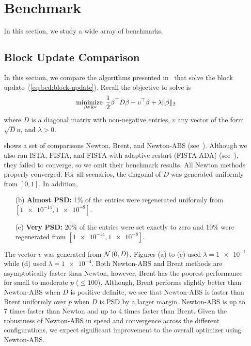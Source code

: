 \section{Benchmark}\label{sec:benchmark}

In this section, we study a wide array of benchmarks.

\subsection{Block Update Comparison}\label{ssec:benchmark:pgd-newton}

In this section, we compare the algorithms presented 
in~
that solve the block update~(\ref{eq:bcd:block-update}).
Recall the objective to solve is
\begin{align*}
    \operatorname*{minimize\;}_{\beta \in \mathbb{R}^p}
    \frac{1}{2} \beta^\top D \beta
    - v^\top \beta
    + \lambda \|\beta\|_2
\end{align*}
where $D$ is a diagonal matrix with non-negative entries,
$v$ any vector of the form $\sqrt{D} u$, and $\lambda > 0$.

 shows a set of comparisons
Newton, Brent, and Newton-ABS
(see~).
Although we also ran ISTA, FISTA, and FISTA with adaptive restart (FISTA-ADA)
(see~), they failed to converge, so we omit their benchmark results.
All Newton methods properly converged.
For all scenarios, the diagonal of $D$ was generated uniformly from $[0, 1]$.
In addition,
\begin{enumerate}
    \item[(b)] \textbf{Almost PSD:} 1\% of the entries were regenerated uniformly from $[\num{1e-14}, \num{1e-8}]$.
    \item[(c)] \textbf{Very PSD:} 20\% of the entries were set exactly to zero and 10\% were regenerated from $[\num{1e-14}, \num{1e-8}]$.
\end{enumerate}
The vector $v$ was generated from $\mathcal{N}\left(0, D\right)$.
Figures (a) to (c) used $\lambda=\num{1e-1}$ while (d) used $\lambda=\num{1e-4}$.
Both Newton-ABS and Brent methods are asymptotically faster than Newton,
however, Brent has the poorest performance for small to moderate $p$ ($\leq 100$).
Although, Brent performs slightly better than Newton-ABS when $D$ is positive definite,
we see that Newton-ABS is faster than Brent uniformly over $p$ when $D$ is PSD
by a larger margin.
Newton-ABS is up to 7 times faster than Newton and up to 4 times faster than Brent.
Given the robustness of Newton-ABS in speed and convergence across the different configurations,
we expect significant improvement to the overall optimizer using Newton-ABS.

